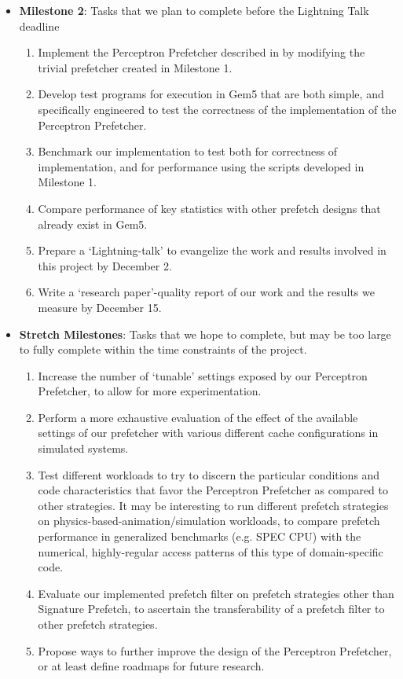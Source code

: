 \documentclass[conference]{IEEEtran}
\begin{document}
\begin{itemize}
\item\textbf{Milestone 2}: Tasks that we plan to complete before the Lightning Talk deadline
  \begin{enumerate}
      \item Implement the Perceptron Prefetcher described in \cite{ppf} by modifying the trivial prefetcher created in Milestone 1.
      \item Develop test programs for execution in Gem5 that are both simple, and specifically engineered to test the correctness of the implementation of the Perceptron Prefetcher.
      \item Benchmark our implementation to test both for correctness of implementation, and for performance using the scripts developed in Milestone 1.
      \item Compare performance of key statistics with other prefetch designs that already exist in Gem5.
      \item Prepare a `Lightning-talk' to evangelize the work and results involved in this project by December 2.
      \item Write a `research paper'-quality report of our work and the results we measure by December 15.
  \end{enumerate} 
\item\textbf{Stretch Milestones}: Tasks that we hope to complete, but may be too large to fully complete within the time constraints of the project.
  \begin{enumerate}
      \item Increase the number of `tunable' settings exposed by our Perceptron Prefetcher, to allow for more experimentation. 
      \item Perform a more exhaustive evaluation of the effect of the available settings of our prefetcher with various different cache configurations in simulated systems.
      \item Test different workloads to try to discern the particular conditions and code characteristics that favor the Perceptron Prefetcher as compared to other strategies. It may be interesting to run different prefetch strategies on physics-based-animation/simulation workloads, to compare prefetch performance in generalized benchmarks (e.g. SPEC CPU) with the numerical, highly-regular access patterns of this type of domain-specific code.
      \item Evaluate our implemented prefetch filter on prefetch strategies other than Signature Prefetch, to ascertain the transferability of a prefetch filter to other prefetch strategies.
      \item Propose ways to further improve the design of the Perceptron Prefetcher, or at least define roadmaps for future research.
  \end{enumerate}
\end{itemize}
\end{document}
